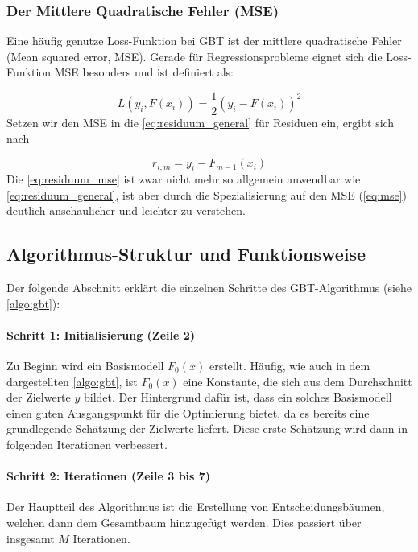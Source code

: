 \subsubsection{Der Mittlere Quadratische Fehler (MSE)}
Eine häufig genutze Loss-Funktion bei GBT ist der mittlere quadratische Fehler (Mean squared error, MSE). Gerade für Regressionsprobleme eignet sich die Loss-Funktion MSE besonders und ist  definiert als:

\begin{equation}
    L(y_i, F(x_i)) = \frac{1}{2}(y_i - F(x_i))^2 \label{eq:mse}
\end{equation}
Setzen wir den MSE in die \autoref{eq:residuum_general} für Residuen ein, ergibt sich nach \textcite[S.~346]{Frochte2020}

\begin{equation}
    \label{eq:residuum_mse}
    r_{i,m} = y_i-F_{m-1}(x_i)
\end{equation}
Die \autoref{eq:residuum_mse} ist zwar nicht mehr so allgemein anwendbar wie \autoref{eq:residuum_general}, ist aber durch die Spezialisierung auf den MSE (\autoref{eq:mse}) deutlich anschaulicher und leichter zu verstehen.

\subsection{Algorithmus-Struktur und Funktionsweise}
Der folgende Abschnitt erklärt die einzelnen Schritte des GBT-Algorithmus (siehe \autoref{algo:gbt}):

\paragraph{Schritt 1: Initialisierung (Zeile 2)}\label{para:GBT_Initialisierung}
Zu Beginn wird ein Basismodell \( F_0(x) \) erstellt. Häufig, wie auch in dem dargestellten \autoref{algo:gbt}, ist \( F_0(x) \) eine Konstante, die sich aus dem Durchschnitt der Zielwerte \( y\) bildet. Der Hintergrund dafür ist, dass ein solches Basismodell einen guten Ausgangspunkt für die Optimierung bietet, da es bereits eine grundlegende Schätzung der Zielwerte liefert. Diese erste Schätzung wird dann in  folgenden Iterationen verbessert.

\paragraph{Schritt 2: Iterationen (Zeile 3 bis 7)}
Der Hauptteil des Algorithmus ist die Erstellung von Entscheidungsbäumen, welchen dann dem Gesamtbaum hinzugefügt werden. Dies passiert über insgesamt \( M \) Iterationen.

